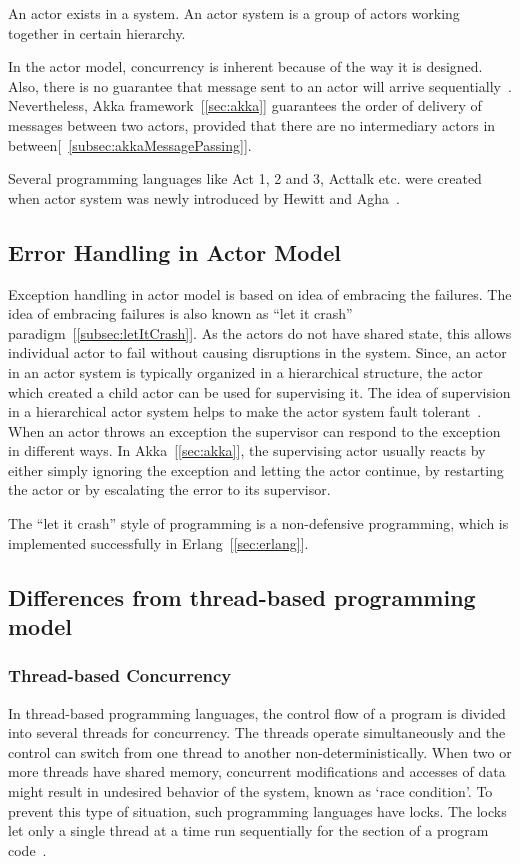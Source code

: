   An actor exists in a system. An actor system is a group of actors working together in certain hierarchy.

  In the actor model, concurrency is inherent because of the way it is designed. Also, there is no guarantee that message sent to an actor will arrive sequentially~\cite{hewittVideo}. Nevertheless, Akka framework~[\autoref{sec:akka}] guarantees the order of delivery of messages between two actors, provided that there are no intermediary actors in between[~\autoref{subsec:akkaMessagePassing}].

  Several programming languages like Act 1, 2 and 3, Acttalk etc. were created when actor system was newly introduced by Hewitt and Agha~\cite{agha, hewitt}.

\subsection{Error Handling in Actor Model}
Exception handling in actor model is based on idea of embracing the failures. The idea of embracing failures is also known as “let it crash” paradigm~[\autoref{subsec:letItCrash}]. As the actors do not have shared state, this allows individual actor to fail without causing disruptions in the system. Since, an actor in an actor system is typically organized in a hierarchical structure, the actor which created a child actor can be used for supervising it. The idea of supervision in a hierarchical actor system helps to make the actor system fault tolerant~\cite{Erb2012}. When an actor throws an exception the supervisor can respond to the exception in different ways. In Akka~[\autoref{sec:akka}], the supervising actor usually reacts by either simply ignoring the exception and letting the actor continue, by restarting the actor or by escalating the error to its supervisor.

  The “let it crash” style of programming is a non-defensive programming, which is implemented successfully in Erlang~[\autoref{sec:erlang}].

\subsection{Differences from thread-based programming model}
\subsubsection{Thread-based Concurrency}
  \label{subsec:thread}
  In thread-based programming languages, the control flow of a program is divided into several threads for concurrency. The threads operate simultaneously and the control can switch from one thread to another non-deterministically. When two or more threads have shared memory, concurrent modifications and accesses of data might result in undesired behavior of the system, known as ‘race condition’. To prevent this type of situation, such programming languages have locks. The locks let only a single thread at a time run sequentially for the section of a program code~\cite{ambientTalk}.

